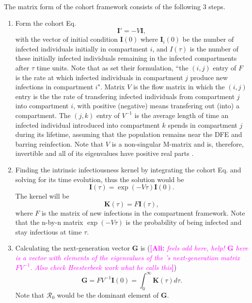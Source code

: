\documentclass[12pt]{article}
\newcommand{\ali}[1]{\comment{magenta}{Ali}{#1}}
\DeclareRobustCommand\_{\ifmmode\expandafter\subtxt\else\textunderscore\fi}
\newcommand{\R}{\ensuremath{\mathcal{R}_0}}
\renewcommand{\vec}[1]{\ensuremath{\mathbf{#1}}} %
\newcommand{\comment}{\showcomment}
\newcommand{\showcomment}[3]{\textcolor{#1}{\textbf{[#2: }\textsl{#3}\textbf{]}}}
\theoremstyle{definition} %
\begin{document}
The matrix form of the cohort framework consists of the following 3 steps.
\begin{enumerate}[{\it Step 1.}]
\item
Form the cohort Eq. 
\begin{equation}
\label{eq:cohort}
\vec I'=-V \vec I,
\end{equation}
 with the vector of initial condition $\vec I(0)$ where $\vec I_i(0)$ be the number of infected individuals initially in compartment $i$, and $I(\tau)$ is the number of these initially infected individuals remaining in the infected compartments after $\tau$ time units.
Note that as \cite{van2002reproduction} set their formulation, 
``the $(i,j)$ entry of $F$ is the rate at which infected individuals in compartment $j$ produce new infections in compartment $i$". Matrix $V$ is the flow matrix in which the $(i,j)$ entry is the the rate of transfering infected individuals from compartment $j$ into compartment $i$, with positive (negative) means transfering out (into) a compartment.
The $(j,k)$ entry of $V^{-1}$ is the average length of time an infected individual introduced into compartment $k$ spends in compartment $j$ during its lifetime, assuming that the population remains near the DFE and barring reinfection.
Note that $V$ is a non-singular M-matrix and is, therefore, invertible and all of its eigenvalues have positive real parts \citep{van2002reproduction}.

\item 
Finding the intrinsic infectiousness kernel by integrating the cohort Eq. and solving for its time evolution, thus
the solution would be 
\begin{equation}
\label{eq:I}
\vec I(\tau) = \exp(-V\tau) \vec I(0).
\end{equation}
The kernel will be 
\begin{equation}
\label{eq:kernel}
\vec K(\tau) = F \vec I(\tau), 
\end{equation}
where $F$ is the matrix of new infections in the compartment framework.
Note that the n-by-n matrix $\exp(-V\tau)$ is the probability of being infected and stay infectious at time $\tau$. 

\item
Calculating the next-generation vector $\vec G$ is 
(\ali{feels odd here, help! $\vec G$ here is a vector with elements of the eigenvalues of the \citep{van2002reproduction}'s next-generation matrix $FV^{-1}$. 
Also check Heesterbeek work what he calls this}) 
\begin{equation}
\label{eq:ng} %
\vec G = FV^{-1} \vec I(0)= \int_0^\infty \vec K(\tau) d\tau.
\end{equation}
Note that $\R$ would be the dominant element of $\vec G$.
\end{enumerate}
\end{document}
